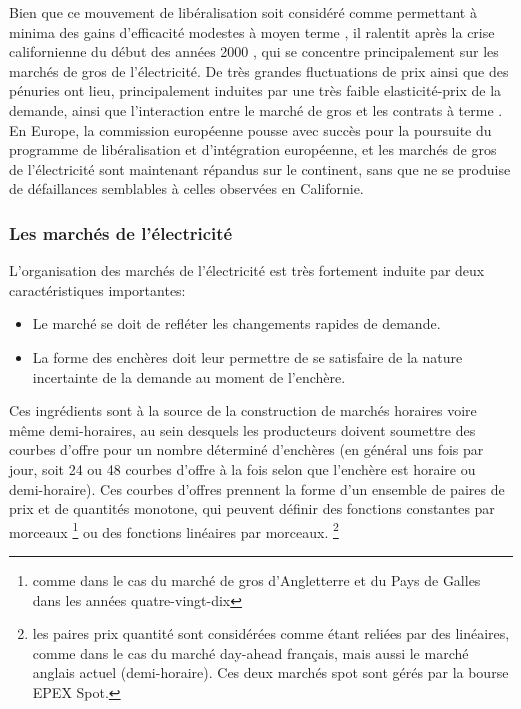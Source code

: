 Bien que ce mouvement de libéralisation soit considéré comme permettant à minima des gains d'efficacité modestes à moyen terme \cite{fabrizio2007markets}, il ralentit après la crise californienne du début des années 2000 \cite{jamasb2005electricity}, qui se concentre principalement sur les marchés de gros de l'électricité. De très grandes fluctuations de prix ainsi que des pénuries ont lieu, principalement induites par une très faible elasticité-prix de la demande, ainsi que l'interaction entre le marché de gros et les contrats à terme \cite{borenstein2002trouble}. En Europe, la commission européenne pousse avec succès pour la poursuite du programme de libéralisation et d'intégration européenne, et les marchés de gros de l'électricité sont maintenant répandus sur le continent, sans que ne se produise de défaillances semblables à celles observées en Californie. 

\subsubsection*{Les marchés de l'électricité}
L'organisation des marchés de l'électricité est très fortement induite par deux caractéristiques importantes:
\begin{itemize}
\item Le marché se doit de refléter les changements rapides de demande.
\item La forme des enchères doit leur permettre de se satisfaire de la nature incertainte de la demande au moment de l'enchère.
\end{itemize}

Ces ingrédients sont à la source de la construction de marchés horaires voire même demi-horaires, au sein desquels les producteurs doivent soumettre des courbes d'offre pour un nombre déterminé d'enchères (en général uns fois par jour, soit 24 ou 48 courbes d'offre à la fois selon que l'enchère est horaire ou demi-horaire). Ces courbes d'offres prennent la forme d'un ensemble de paires de prix et de quantités monotone, qui peuvent définir des fonctions constantes par morceaux \footnote{comme dans le cas du marché de gros d'Angletterre et du Pays de Galles dans les années quatre-vingt-dix} ou des fonctions linéaires par morceaux. \footnote{les paires prix quantité sont considérées comme étant reliées par des linéaires, comme dans le cas du marché day-ahead français, mais aussi le marché anglais actuel (demi-horaire). Ces deux marchés spot sont gérés par la bourse EPEX Spot.}\\

